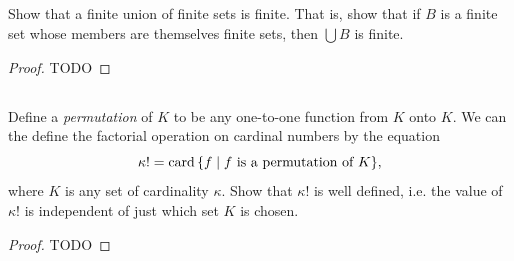 \documentclass{report}
\begin{document}
\subsection{}%

  Show that a finite union of finite sets is finite.
  That is, show that if $B$ is a finite set whose members are themselves finite
    sets, then $\bigcup{B}$ is finite.

  \begin{proof}
    TODO
  \end{proof}

\subsection{}%

  Define a \textit{permutation} of $K$ to be any one-to-one function from $K$
    onto $K$.
  We can the define the factorial operation on cardinal numbers by the equation
    $$\kappa! = \mathop{\text{card}}{\{f \mid f \text{ is a permutation of } K\}},$$
    where $K$ is any set of cardinality $\kappa$.
  Show that $\kappa!$ is well defined, i.e. the value of $\kappa!$ is
    independent of just which set $K$ is chosen.

  \begin{proof}
    TODO
  \end{proof}
\end{document}
